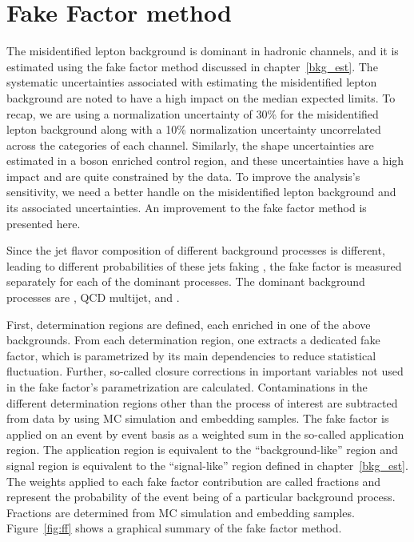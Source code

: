 %
%

\chapter{Fake Factor method}
\label{fakefactor}

The misidentified lepton background is dominant in hadronic channels, and it is estimated using the fake factor method discussed in chapter~\ref{bkg_est}. The systematic uncertainties associated with estimating the misidentified lepton background are noted to have a high impact on the median expected limits. To recap, we are using a normalization uncertainty of 30\% for the misidentified lepton background along with a 10\% normalization uncertainty uncorrelated across the categories of each channel. Similarly, the shape uncertainties are estimated in a \PW boson enriched control region, and these uncertainties have a high impact and are quite constrained by the data. To improve the analysis's sensitivity, we need a better handle on the misidentified lepton background and its associated uncertainties. An improvement to the fake factor method is presented here.

Since the jet flavor composition of different background processes is different, leading to different probabilities of these jets faking \tauh, the fake factor is measured separately for each of the dominant processes. The dominant background processes are \wjets, QCD multijet, and \ttbar.

First, determination regions are defined, each enriched in one of the above backgrounds. From each determination region, one extracts a dedicated fake factor, which is parametrized by its main dependencies to reduce statistical fluctuation. Further, so-called closure corrections in important variables not used in the fake factor's parametrization are calculated. Contaminations in the different determination regions other than the process of interest are subtracted from data by using MC simulation and embedding samples. The fake factor is applied on an event by event basis as a weighted sum in the so-called application region. The application region is equivalent to the ``background-like'' region and signal region is equivalent to the ``signal-like'' region defined in chapter~\ref{bkg_est}. The weights applied to each fake factor contribution are called fractions and represent the probability of the event being of a particular background process. Fractions are determined from MC simulation and embedding samples. Figure~\ref{fig:ff} shows a graphical summary of the fake factor method.

